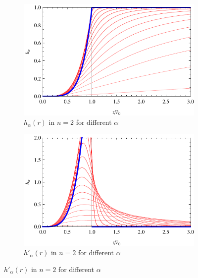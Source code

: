\documentclass[12pt,a4paper]{report}
\numberwithin{equation}{chapter}
\begin{document}
\begin{appendices}
\begin{figure}
\begin{subfigure}{0.5\textwidth}
\caption{$h_\alpha(r)$ in $n=2$ for different $\alpha$}
\label{fig:profile-halpha}%
\includegraphics[width=\textwidth]{figures/profile-halpha.pdf}
\end{subfigure}%
\begin{subfigure}{0.5\textwidth}
\caption{$h'_\alpha(r)$ in $n=2$ for different $\alpha$}
\label{fig:apx-dirac-halpha}%
\includegraphics[width=\textwidth]{figures/dirac-profile-halpha.pdf}
\end{subfigure}


\end{figure}
\end{appendices}
\end{document}
